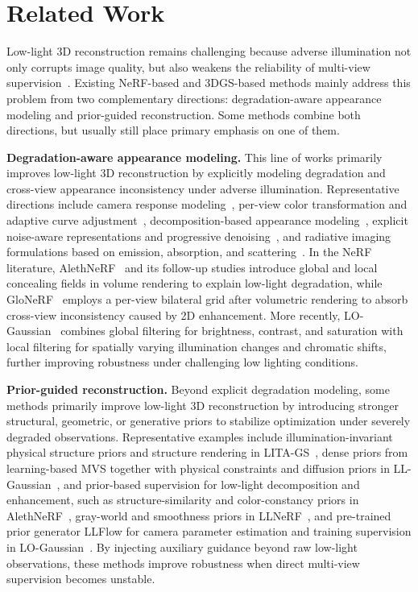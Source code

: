 \section{Related Work}
\label{sec:related_work}

Low-light 3D reconstruction remains challenging because adverse illumination
not only corrupts image quality, but also weakens the reliability of multi-view
supervision~\cite{beyond_darkness,ll_gaussian}. Existing NeRF-based and
3DGS-based methods mainly address this problem from two complementary
directions: degradation-aware appearance modeling and prior-guided
reconstruction. Some methods combine both directions, but usually still place
primary emphasis on one of them.

\textbf{Degradation-aware appearance modeling.} This line of works primarily
improves low-light 3D reconstruction by explicitly modeling degradation and
cross-view appearance inconsistency under adverse illumination. Representative
directions include camera response modeling~\cite{gaussian_dk}, per-view color
transformation and adaptive curve adjustment~\cite{cui2025luminance},
decomposition-based appearance modeling~\cite{ll_gaussian,llnerf}, explicit
noise-aware representations and progressive denoising~\cite{zhou2025lita,ll_gaussian},
and radiative imaging formulations based on emission, absorption, and
scattering~\cite{liu2025i2nerf}. In the NeRF literature,
AlethNeRF~\cite{cui2024aleth} and its follow-up studies introduce global and
local concealing fields in volume rendering to explain low-light degradation,
while GloNeRF~\cite{glonerf} employs a per-view bilateral grid after
volumetric rendering to absorb cross-view inconsistency caused by 2D
enhancement. More recently, LO-Gaussian~\cite{lo_gaussian} combines global
filtering for brightness, contrast, and saturation with local filtering for
spatially varying illumination changes and chromatic shifts, further improving
robustness under challenging low lighting conditions.

\textbf{Prior-guided reconstruction.} Beyond explicit degradation modeling,
some methods primarily improve low-light 3D reconstruction by introducing
stronger structural, geometric, or generative priors to stabilize optimization
under severely degraded observations. Representative examples include
illumination-invariant physical structure priors and structure rendering in
LITA-GS~\cite{zhou2025lita}, dense priors from learning-based MVS together
with physical constraints and diffusion priors in LL-Gaussian~\cite{ll_gaussian},
and prior-based supervision for low-light decomposition and enhancement, such
as structure-similarity and color-constancy priors in
AlethNeRF~\cite{cui2024aleth}, gray-world and smoothness priors in
LLNeRF~\cite{llnerf}, and pre-trained prior generator LLFlow for camera
parameter estimation and training supervision in
LO-Gaussian~\cite{lo_gaussian}. By injecting auxiliary guidance beyond raw
low-light observations, these methods improve robustness when direct
multi-view supervision becomes unstable.
